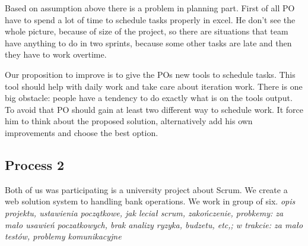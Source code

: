 Based on assumption above there is a problem in planning part. First of all PO have to spend a lot of time to schedule tasks properly in excel. He don't see the whole picture, because of size of the project, so there are situations that team have anything to do in two sprints, because some other tasks are late and then they have to work overtime. 

Our proposition to improve is to give the POs new tools to schedule tasks. This tool should help with daily work and take care about iteration work. There is one big obstacle: people have a tendency to do exactly what is on the tools output. To avoid that PO should gain at least two different way to schedule work. It force him to think about the proposed solution, alternatively add his own improvements and choose the best option. 

\subsection*{Process 2}

Both of us was participating is a university project about Scrum. We create a web solution system to handling bank operations. We work in group of six. 
\textit{opis projektu, ustawienia początkowe, jak leciał scrum, zakończenie, probkemy: za mało usawień poczatkowych, brak analizy ryzyka, budzetu, etc,; w trakcie: za mało testów, problemy komunikacyjne}